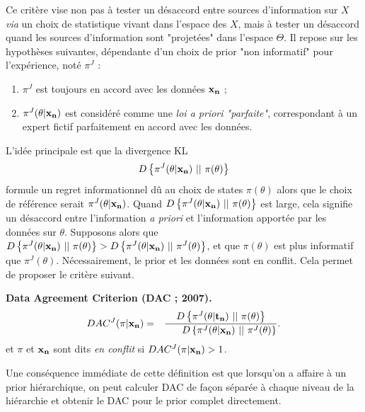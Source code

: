 Ce critère vise non pas à tester un désaccord entre sources d'information sur $X$ {\it via} un choix de statistique vivant dans l'espace des $X$, mais à tester un désaccord quand les sources d'information sont "projetées" dans l'espace $\Theta$. Il repose sur les hypothèses suivantes, dépendante d'un choix de prior "non informatif" pour l'expérience, noté $\pi^J$ :
\begin{enumerate}
    \item $\pi^J$ est toujours en accord avec les données ${\bf
 x_n}$ ;
    \item $\pi^J(\theta|{\bf x_n})$ est considéré comme une \emph{loi {\it a priori} 
"parfaite"}, correspondant à un expert fictif parfaitement en accord avec les données. 
\end{enumerate}
L'idée principale est que la divergence KL
\begin{eqnarray*}
D\left\{\pi^{J}(\theta|{\bf x_n}) \ || \ \pi(\theta)\right\}
\end{eqnarray*}
formule un regret informationnel dû au choix de states $\pi(\theta)$ alors que le choix de référence serait 
 $\pi^{J}(\theta|{\bf x_n})$. Quand $D\left\{\pi^{J}(\theta|{\bf x_n}) \ || \
\pi(\theta)\right\}$ est large, cela signifie un désaccord entre l'information {\it a priori} et l'information apportée par les données sur $\theta$. Supposons alors que $D\left\{\pi^{J}(\theta|{\bf x_n}) \ || \ \pi(\theta)\right\}>D\left\{\pi^{J}(\theta|{\bf x_n}) \ || \ \pi^J(\theta)\right\}$, et que $\pi(\theta)$ est plus informatif que $\pi^J(\theta)$. Nécessairement, le prior et les données sont en conflit. Cela permet de proposer le critère suivant.

\begin{definition}{\bf Data Agreement Criterion (DAC ; 2007).}
\begin{eqnarray*}
DAC^J(\pi|{\bf x_n}) & = &  \frac{D\left\{ \pi^{J}(\theta|{\bf
t_n}) \ || \ \pi(\theta)\right\}}{\ \ \ \ \ D\left\{
\pi^{J}(\theta|{\bf x_n}) \ || \
\pi^{J}(\theta)\right\}}.\label{coherstat}
\end{eqnarray*}
et $\pi$ et ${\bf
x_n}$ sont dits \emph{\it en conflit} si
$DAC^J(\pi|{\bf x_n})> 1$. 
\end{definition}

Une conséquence immédiate de cette définition est que lorsqu'on a affaire à un prior hiérarchique, on peut calculer DAC de fa\c con séparée à chaque niveau de la hiérarchie et obtenir le DAC pour le prior complet directement.  

